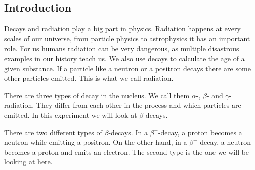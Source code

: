 \subsection{Introduction}
Decays and radiation play a big part in physics.
Radiation happens at every scales of our universe, from particle physics to astrophysics it has an important role.
For us humans radiation can be very dangerous, as multiple disastrous examples in our history teach us.
We also use decays to calculate the age of a given substance.
If a particle like a neutron or a positron decays there are some other particles emitted.
This is what we call radiation.

There are three types of decay in the nucleus.
We call them $\alpha$-, $\beta$- and $\gamma$-radiation.
They differ from each other in the process and which particles are emitted.
In this experiment we will look at $\beta$-decays.

There are two different types of $\beta$-decays.
In a $\beta^+$-decay, a proton becomes a neutron while emitting a positron.
On the other hand, in a $\beta^-$-decay, a neutron becomes a proton and emits an electron.
The second type is the one we will be looking at here.

